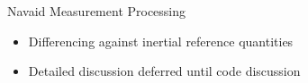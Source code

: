 \begin{frame}
Navaid Measurement Processing
 \begin{itemize}
 \item Differencing against inertial reference quantities
 \item Detailed discussion deferred until code discussion
\end{itemize}
\end{frame}
